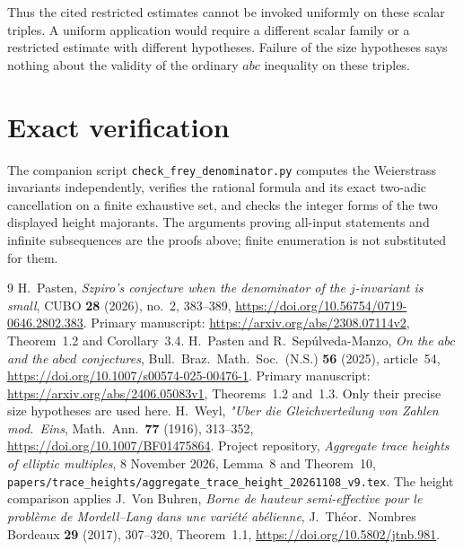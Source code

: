 \documentclass[11pt,a4paper]{article}
\begin{document}
Thus the cited restricted estimates cannot be invoked uniformly on
these scalar triples. A uniform application would require a different
scalar family or a restricted estimate with different hypotheses.
Failure of the size hypotheses says nothing about the validity of
the ordinary $abc$ inequality on these triples.

\section{Exact verification}

The companion script \texttt{check\_frey\_denominator.py} computes the
Weierstrass invariants independently, verifies the rational formula
and its exact two-adic cancellation on a finite exhaustive set, and
checks the integer forms of the two displayed height majorants.
The arguments proving all-input statements and infinite subsequences
are the proofs above; finite enumeration is not substituted for them.

\begin{thebibliography}{9}
H.~Pasten, \emph{Szpiro's conjecture when the denominator of the
$j$-invariant is small}, CUBO \textbf{28} (2026), no.~2, 383--389,
\url{https://doi.org/10.56754/0719-0646.2802.383}.
Primary manuscript: \url{https://arxiv.org/abs/2308.07114v2},
Theorem~1.2 and Corollary~3.4.
H.~Pasten and R.~Sep\'ulveda-Manzo, \emph{On the $abc$ and the $abcd$
conjectures}, Bull.~Braz.~Math.~Soc.~(N.S.) \textbf{56} (2025), article~54,
\url{https://doi.org/10.1007/s00574-025-00476-1}.
Primary manuscript: \url{https://arxiv.org/abs/2406.05083v1},
Theorems~1.2 and~1.3. Only their precise size hypotheses are used here.
H.~Weyl, \emph{"Uber die Gleichverteilung von Zahlen mod.~Eins},
Math.~Ann.~\textbf{77} (1916), 313--352,
\url{https://doi.org/10.1007/BF01475864}.
Project repository, \emph{Aggregate trace heights of elliptic multiples},
8 November 2026, Lemma~8 and Theorem~10,
\nolinkurl{papers/trace_heights/aggregate_trace_height_20261108_v9.tex}.
The height comparison applies J.~Von Buhren,
\emph{Borne de hauteur semi-effective pour le probl\`eme de
Mordell--Lang dans une vari\'et\'e ab\'elienne},
J.~Th\'eor.~Nombres Bordeaux \textbf{29}
(2017), 307--320, Theorem~1.1,
\url{https://doi.org/10.5802/jtnb.981}.
\end{thebibliography}
\end{document}
